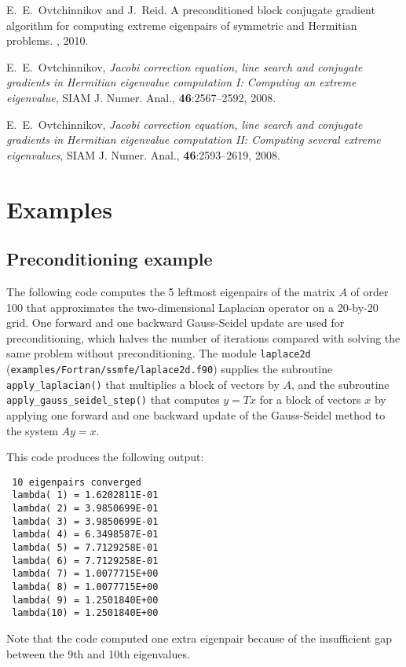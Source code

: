 E.~E.~Ovtchinnikov and J.~Reid.
A preconditioned block conjugate gradient
algorithm for computing extreme eigenpairs
of symmetric and Hermitian problems.
\report, 2010.

E.~E.~Ovtchinnikov,
{\em Jacobi correction equation, line search and
conjugate gradients in Hermitian eigenvalue computation I:
Computing an extreme eigenvalue},
SIAM J. Numer. Anal., {\bf 46}:2567--2592, 2008.

E.~E.~Ovtchinnikov,
{\em Jacobi correction equation, line search and
conjugate gradients in Hermitian eigenvalue computation II:
Computing several extreme eigenvalues},
SIAM J. Numer. Anal., {\bf 46}:2593--2619, 2008.

\section{Examples}

\subsection{Preconditioning example}
\label{sec:ex.prec}

The following code 
computes the 5 leftmost eigenpairs of 
the matrix $A$ of order 100 that approximates 
the two-dimensional Laplacian operator
on a 20-by-20 grid.
One forward and one backward Gauss-Seidel update
are used for preconditioning,
which halves the number of iterations
compared with solving the same problem without preconditioning.
The module {\tt laplace2d} (\texttt{examples/Fortran/ssmfe/laplace2d.f90})
supplies the subroutine {\tt apply\_laplacian()}
that multiplies a block of vectors by $A$,
and the subroutine 
{\tt apply\_gauss\_seidel\_step()}
that computes $y = T x$ for a block of vectors $x$
by applying one forward and one backward update
of the Gauss-Seidel method to the system $A y = x$.

This code produces the following output:
\begin{verbatim}
 10 eigenpairs converged
 lambda( 1) = 1.6202811E-01
 lambda( 2) = 3.9850699E-01
 lambda( 3) = 3.9850699E-01
 lambda( 4) = 6.3498587E-01
 lambda( 5) = 7.7129258E-01
 lambda( 6) = 7.7129258E-01
 lambda( 7) = 1.0077715E+00
 lambda( 8) = 1.0077715E+00
 lambda( 9) = 1.2501840E+00
 lambda(10) = 1.2501840E+00
\end{verbatim}

Note that the code computed one extra eigenpair
because of the insufficient gap between the 9th and 10th
eigenvalues.
